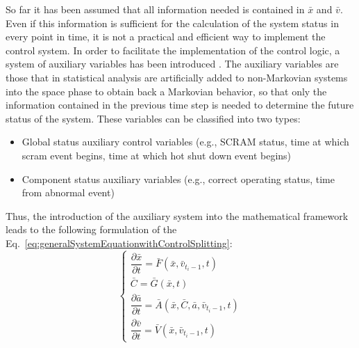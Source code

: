 \documentclass{mc2013}
\begin{document}
\label{sec:auxiliary}
So far it has been assumed that all information needed is contained in $\bar{x}$ and $\bar{v}$. Even if this information is sufficient for the calculation of the system status in every point in time, it is not a practical and efficient way to implement the control system.
In order to facilitate the implementation of the control logic, a system of auxiliary variables has been introduced .
The auxiliary variables are those that in statistical analysis are artificially added to non-Markovian systems into the space phase to obtain back a Markovian behavior, so that only the information contained in the previous time step is needed to determine the future status of the system.
These variables can be classified into two types: 
\begin{itemize}
\item Global status auxiliary control variables (e.g., SCRAM status, time at which scram event begins, time at which hot shut down event begins)
\item Component status auxiliary variables (e.g., correct operating status, time from abnormal event)
\end{itemize}
Thus, the introduction of the auxiliary system into the mathematical framework leads to the following formulation of the Eq.~\ref{eq:generalSystemEquationwithControlSplitting}:
\begin{equation}
\begin{cases} 
\dfrac{\partial \bar{x}}{\partial t} = \bar{F}(\bar{x},\bar{v}_{t_{i}-1},t) \\
\bar{C} = \bar{G}(\bar{x},t) \\ 
\dfrac{\partial \bar{a}}{\partial t} = \bar{A}(\bar{x},\bar{C},\bar{a},\bar{v}_{t_{i}-1},t) \\
\dfrac{\partial \bar{v}}{\partial t} = \bar{V}(\bar{x},\bar{v}_{t_{i}-1},t) 
\end{cases}
\label{eq:generalSystemEquationwithControlSplittingAndAux}
\end{equation}


\end{document}
